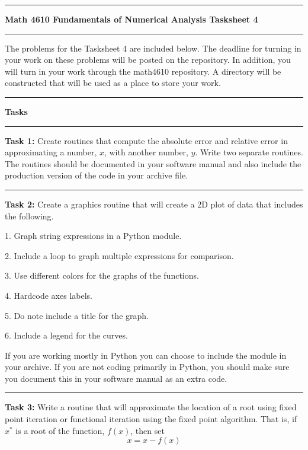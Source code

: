 \documentclass[10pt,fleqn]{article}
\begin{document}
\vskip0.1in\hrule\vskip0.1in \noindent
{\bf{\Large Math 4610 Fundamentals of Numerical Analysis Tasksheet 4}}
\vskip0.1in\hrule\vskip0.1in \noindent
The problems for the Tasksheet 4 are included below. The deadline for turning
in your work on these problems will be posted on the repository. In addition,
you will turn in your work through the math4610 repository. A directory will be
constructed that will be used as a place to store your work.
\vskip0.1in\hrule\vskip0.1in \noindent
{\bf{\large Tasks}}
\vskip0.1in\hrule\vskip0.1in \noindent
\begin{trivlist}
  \item[\bf Task 1:]
    Create routines that compute the absolute error and relative error in
    approximating a number, \(x\), with another number, \(y\). Write two
    separate routines. The routines should be documented in your software manual
    and also include the production version of the code in your archive file.
\vskip0.1in\hrule\vskip0.1in \noindent
  \item[\bf Task 2:] Create a graphics routine that will create a 2D plot of 
    data that includes the following.
    \begin{trivlist}
      \item[1.] Graph string expressions in a Python module. 
      \item[2.] Include a loop to graph multiple expressions for comparison.
      \item[3.] Use different colors for the graphs of the functions.
      \item[4.] Hardcode axes labels.
      \item[5.] Do note include a title for the graph.
      \item[6.] Include a legend for the curves.
    \end{trivlist}
    If you are working mostly in Python you can choose to include the module in
    your archive. If you are not coding primarily in Python, you should make
    sure you document this in your software manual as an extra code.
\vskip0.1in\hrule\vskip0.1in \noindent
  \item[\bf Task 3:] 
    Write a routine that will approximate the location of a root using fixed
    point iteration or functional iteration using the fixed point algorithm.
    That is, if \(x^*\) is a root of the function, \(f(x)\), then set
    \[
      x = x - f(x)
\]
\end{trivlist}
\end{document}
